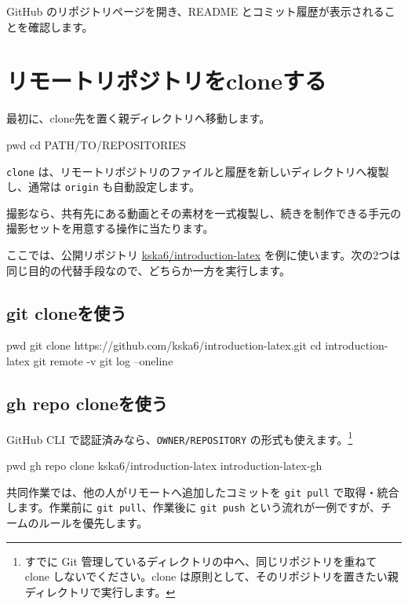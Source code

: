 \documentclass[a4paper,11pt]{jlreq}
\newcommand{\cmd}[1]{\texttt{#1}}
\begin{document}
GitHub のリポジトリページを開き、README とコミット履歴が表示されることを確認します。

\section{リモートリポジトリをcloneする}

最初に、clone先を置く親ディレクトリへ移動します。

\begin{codeblock}
pwd
cd PATH/TO/REPOSITORIES
\end{codeblock}

\cmd{clone} は、リモートリポジトリのファイルと履歴を新しいディレクトリへ複製し、通常は \cmd{origin} も自動設定します。

撮影なら、共有先にある動画とその素材を一式複製し、続きを制作できる手元の撮影セットを用意する操作に当たります。

ここでは、公開リポジトリ \href{https://github.com/kska6/introduction-latex}{kska6/introduction-latex} を例に使います。次の2つは同じ目的の代替手段なので、どちらか一方を実行します。

\subsection{git cloneを使う}

\begin{codeblock}
pwd
git clone https://github.com/kska6/introduction-latex.git
cd introduction-latex
git remote -v
git log --oneline
\end{codeblock}

\subsection{gh repo cloneを使う}

GitHub CLI で認証済みなら、\cmd{OWNER/REPOSITORY} の形式も使えます。\footnote{すでに Git 管理しているディレクトリの中へ、同じリポジトリを重ねて clone しないでください。clone は原則として、そのリポジトリを置きたい親ディレクトリで実行します。}

\begin{codeblock}
pwd
gh repo clone kska6/introduction-latex introduction-latex-gh
\end{codeblock}

共同作業では、他の人がリモートへ追加したコミットを \cmd{git pull} で取得・統合します。作業前に \cmd{git pull}、作業後に \cmd{git push} という流れが一例ですが、チームのルールを優先します。
\end{document}
